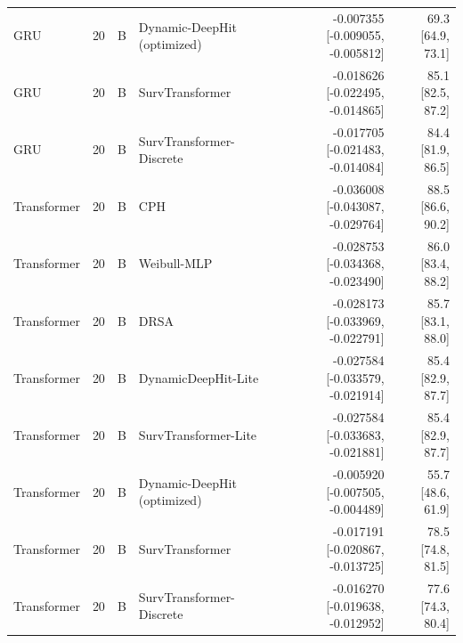 \begin{longtable}{lll p{3.0cm} rr}
GRU & 20 & B & Dynamic-DeepHit (optimized) & -0.007355 [-0.009055, -0.005812] & 69.3 [64.9, 73.1]\\
GRU & 20 & B & SurvTransformer & -0.018626 [-0.022495, -0.014865] & 85.1 [82.5, 87.2]\\
GRU & 20 & B & SurvTransformer-Discrete & -0.017705 [-0.021483, -0.014084] & 84.4 [81.9, 86.5]\\
Transformer & 20 & B & CPH & -0.036008 [-0.043087, -0.029764] & 88.5 [86.6, 90.2]\\
Transformer & 20 & B & Weibull-MLP & -0.028753 [-0.034368, -0.023490] & 86.0 [83.4, 88.2]\\
Transformer & 20 & B & DRSA & -0.028173 [-0.033969, -0.022791] & 85.7 [83.1, 88.0]\\
Transformer & 20 & B & DynamicDeepHit-Lite & -0.027584 [-0.033579, -0.021914] & 85.4 [82.9, 87.7]\\
Transformer & 20 & B & SurvTransformer-Lite & -0.027584 [-0.033683, -0.021881] & 85.4 [82.9, 87.7]\\
Transformer & 20 & B & Dynamic-DeepHit (optimized) & -0.005920 [-0.007505, -0.004489] & 55.7 [48.6, 61.9]\\
Transformer & 20 & B & SurvTransformer & -0.017191 [-0.020867, -0.013725] & 78.5 [74.8, 81.5]\\
Transformer & 20 & B & SurvTransformer-Discrete & -0.016270 [-0.019638, -0.012952] & 77.6 [74.3, 80.4]\\
\end{longtable}
\endgroup
